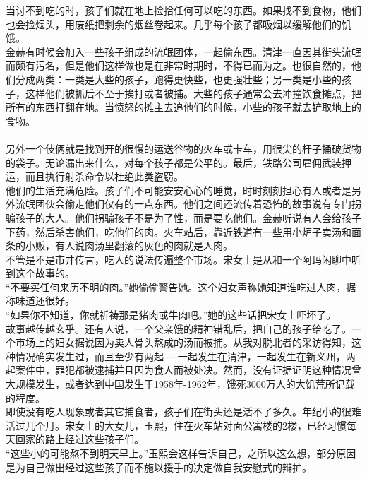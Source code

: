 当讨不到吃的时，孩子们就在地上捡拾任何可以吃的东西。如果找不到食物，他们也会捡烟头，用废纸把剩余的烟丝卷起来。几乎每个孩子都吸烟以缓解他们的饥饿。\\

金赫有时候会加入一些孩子组成的流氓团体，一起偷东西。清津一直因其街头流氓而颇有污名，但是他们这样做也是在非常时期时，不得已而为之。也很自然的，他们分成两类：一类是大些的孩子，跑得更快些，也更强壮些；另一类是小些的孩子，这样他们被抓后不至于挨打或者被捕。大些的孩子通常会去冲撞饮食摊点，把所有的东西打翻在地。当愤怒的摊主去追他们的时候，小些的孩子就去铲取地上的食物。\\
\\

另外一个伎俩就是找到开的很慢的运送谷物的火车或卡车，用很尖的杆子捅破货物的袋子。无论漏出来什么，对每个孩子都是公平的。最后，铁路公司雇佣武装押运，而且执行射杀命令以杜绝此类盗窃。\\

他们的生活充满危险。孩子们不可能安安心心的睡觉，时时刻刻担心有人或者是另外流氓团伙会偷走他们仅有的一点东西。他们之间还流传着恐怖的故事说有专门拐骗孩子的大人。他们拐骗孩子不是为了性，而是要吃他们。金赫听说有人会给孩子下药，然后杀害他们，吃他们的肉。火车站后，靠近铁道有一些用小炉子卖汤和面条的小贩，有人说肉汤里翻滚的灰色的肉就是人肉。\\

不管是不是市井传言，吃人的说法传遍整个市场。宋女士是从和一个阿玛闲聊中听到这个故事的。\\

“不要买任何来历不明的肉。”她偷偷警告她。这个妇女声称她知道谁吃过人肉，据称味道还很好。\\

“如果你不知道，你就祈祷那是猪肉或牛肉吧。”她的这些话把宋女士吓坏了。\\

故事越传越玄乎。还有人说，一个父亲饿的精神错乱后，把自己的孩子给吃了。一个市场上的妇女据说因为卖人骨头熬成的汤而被捕。从我对脱北者的采访得知，这种情况确实发生过，而且至少有两起──一起发生在清津，一起发生在新义州，两起案件中，罪犯都被逮捕并且因为食人而被处决。然而，没有证据证明这种情况曾大规模发生，或者达到中国发生于1958年-1962年，饿死3000万人的大饥荒所记载的程度。\\

即使没有吃人现象或者其它捕食者，孩子们在街头还是活不了多久。年纪小的很难活过几个月。宋女士的大女儿，玉熙，住在火车站对面公寓楼的2楼，已经习惯每天回家的路上经过这些孩子们。\\

“这些小的可能熬不到明天早上。”玉熙会这样告诉自己，之所以这么想，部分原因是为自己做出经过这些孩子而不施以援手的决定做自我安慰式的辩护。\\

